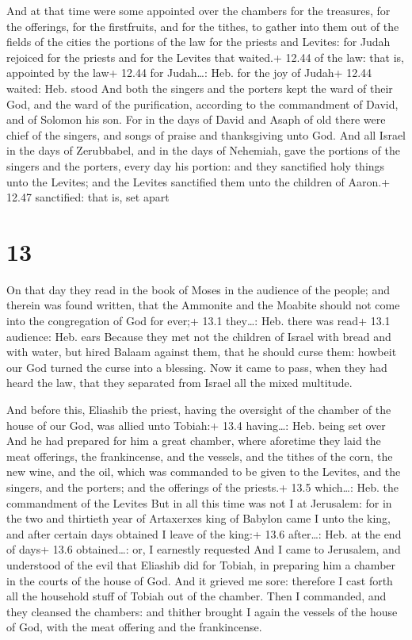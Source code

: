  And at that time were some appointed over the chambers
for the treasures, for the offerings, for the firstfruits, and for the
tithes, to gather into them out of the fields of the cities the portions
of the law for the priests and Levites: for Judah rejoiced for the
priests and for the Levites that waited.+ 12.44 of the law: that is,
appointed by the law+ 12.44 for Judah\ldots: Heb. for the joy of Judah+
12.44 waited: Heb. stood  And both the singers and the
porters kept the ward of their God, and the ward of the purification,
according to the commandment of David, and of Solomon his son.
 For in the days of David and Asaph of old there were chief
of the singers, and songs of praise and thanksgiving unto God.
 And all Israel in the days of Zerubbabel, and in the days
of Nehemiah, gave the portions of the singers and the porters, every day
his portion: and they sanctified holy things unto the Levites; and the
Levites sanctified them unto the children of Aaron.+ 12.47 sanctified:
that is, set apart

\hypertarget{section-12}{%
\section{13}\label{section-12}}

 On that day they read in the book of Moses in the audience
of the people; and therein was found written, that the Ammonite and the
Moabite should not come into the congregation of God for ever;+ 13.1
they\ldots: Heb. there was read+ 13.1 audience: Heb. ears 
Because they met not the children of Israel with bread and with water,
but hired Balaam against them, that he should curse them: howbeit our
God turned the curse into a blessing.  Now it came to pass,
when they had heard the law, that they separated from Israel all the
mixed multitude.

 And before this, Eliashib the priest, having the
oversight of the chamber of the house of our God, was allied unto
Tobiah:+ 13.4 having\ldots: Heb. being set over  And he had
prepared for him a great chamber, where aforetime they laid the meat
offerings, the frankincense, and the vessels, and the tithes of the
corn, the new wine, and the oil, which was commanded to be given to the
Levites, and the singers, and the porters; and the offerings of the
priests.+ 13.5 which\ldots: Heb. the commandment of the Levites
 But in all this time was not I at Jerusalem: for in the two
and thirtieth year of Artaxerxes king of Babylon came I unto the king,
and after certain days obtained I leave of the king:+ 13.6 after\ldots:
Heb. at the end of days+ 13.6 obtained\ldots: or, I earnestly requested
 And I came to Jerusalem, and understood of the evil that
Eliashib did for Tobiah, in preparing him a chamber in the courts of the
house of God.  And it grieved me sore: therefore I cast
forth all the household stuff of Tobiah out of the chamber. 
Then I commanded, and they cleansed the chambers: and thither brought I
again the vessels of the house of God, with the meat offering and the
frankincense.

